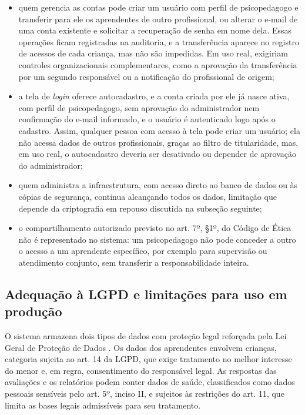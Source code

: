 \begin{itemize}
    \item quem gerencia as contas pode criar um usuário com perfil de psicopedagogo e transferir para ele os aprendentes de outro profissional, ou alterar o e-mail de uma conta existente e solicitar a recuperação de senha em nome dela. Essas operações ficam registradas na auditoria, e a transferência aparece no registro de acessos de cada criança, mas não são impedidas. Em uso real, exigiriam controles organizacionais complementares, como a aprovação da transferência por um segundo responsável ou a notificação do profissional de origem;
    \item a tela de \textit{login} oferece autocadastro, e a conta criada por ele já nasce ativa, com perfil de psicopedagogo, sem aprovação do administrador nem confirmação do e-mail informado, e o usuário é autenticado logo após o cadastro. Assim, qualquer pessoa com acesso à tela pode criar um usuário; ela não acessa dados de outros profissionais, graças ao filtro de titularidade, mas, em uso real, o autocadastro deveria ser desativado ou depender de aprovação do administrador;
    \item quem administra a infraestrutura, com acesso direto ao banco de dados ou às cópias de segurança, continua alcançando todos os dados, limitação que depende da criptografia em repouso discutida na subseção seguinte;
    \item o compartilhamento autorizado previsto no art. 7º, §1º, do Código de Ética não é representado no sistema: um psicopedagogo não pode conceder a outro o acesso a um aprendente específico, por exemplo para supervisão ou atendimento conjunto, sem transferir a responsabilidade inteira.
\end{itemize}

\subsection{Adequação à LGPD e limitações para uso em produção}

O sistema armazena dois tipos de dados com proteção legal reforçada pela Lei Geral de Proteção de Dados \cite{brasil2018_lgpd}. Os dados dos aprendentes envolvem crianças, categoria sujeita ao art. 14 da LGPD, que exige tratamento no melhor interesse do menor e, em regra, consentimento do responsável legal. As respostas das avaliações e os relatórios podem conter dados de saúde, classificados como dados pessoais sensíveis pelo art. 5º, inciso II, e sujeitos às restrições do art. 11, que limita as bases legais admissíveis para seu tratamento.


